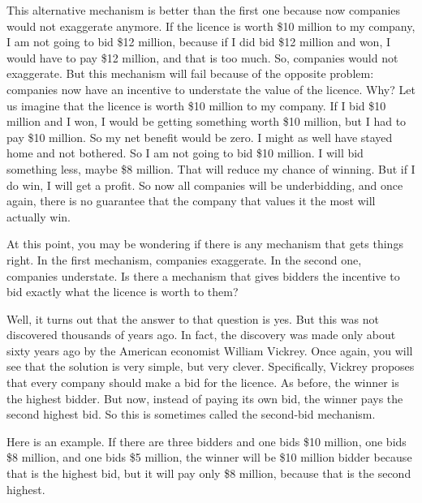 \documentclass[12pt,a4paper]{article}
\newenvironment{original}{%
  \par\vspace{4pt}\noindent%
  \color{black}%
  \ignorespaces
}{%
  \par\vspace{2pt}%
}
\begin{document}
\begin{original}
This alternative mechanism is better than the first one because now companies would not exaggerate anymore. If the licence is worth \$10 million to my company, I am not going to bid \$12 million, because if I did bid \$12 million and won, I would have to pay \$12 million, and that is too much. So, companies would not exaggerate. But this mechanism will fail because of the opposite problem: companies now have an incentive to understate the value of the licence. Why? Let us imagine that the licence is worth \$10 million to my company. If I bid \$10 million and I won, I would be getting something worth \$10 million, but I had to pay \$10 million. So my net benefit would be zero. I might as well have stayed home and not bothered. So I am not going to bid \$10 million. I will bid something less, maybe \$8 million. That will reduce my chance of winning. But if I do win, I will get a profit. So now all companies will be underbidding, and once again, there is no guarantee that the company that values it the most will actually win.

At this point, you may be wondering if there is any mechanism that gets things right. In the first mechanism, companies exaggerate. In the second one, companies understate. Is there a mechanism that gives bidders the incentive to bid exactly what the licence is worth to them?

Well, it turns out that the answer to that question is yes. But this was not discovered thousands of years ago. In fact, the discovery was made only about sixty years ago by the American economist William Vickrey. Once again, you will see that the solution is very simple, but very clever. Specifically, Vickrey proposes that every company should make a bid for the licence. As before, the winner is the highest bidder. But now, instead of paying its own bid, the winner pays the second highest bid. So this is sometimes called the second-bid mechanism.

Here is an example. If there are three bidders and one bids \$10 million, one bids \$8 million, and one bids \$5 million, the winner will be \$10 million bidder because that is the highest bid, but it will pay only \$8 million, because that is the second highest.


\end{original}
\end{document}
